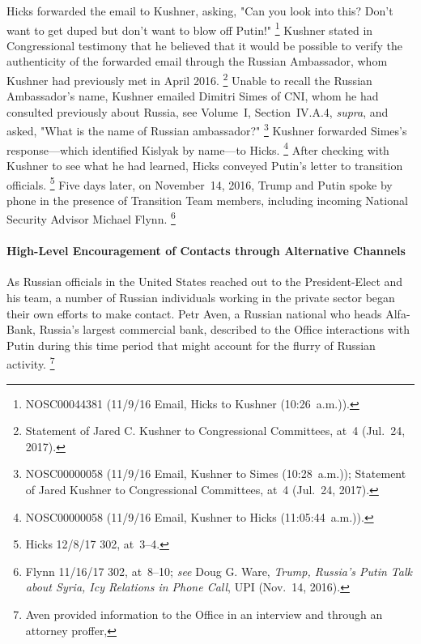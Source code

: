 Hicks forwarded the email to Kushner, asking, "Can you look into this?
Don't want to get duped but don't want to blow off Putin!"%
\footnote{NOSC00044381 (11/9/16 Email, Hicks to Kushner (10:26~a.m.)).}
Kushner stated in Congressional testimony that he believed that it would be possible to verify the authenticity of the forwarded email through the Russian Ambassador, whom Kushner had previously met in April 2016.%
\footnote{Statement of Jared C. Kushner to Congressional Committees, at~4 (Jul.~24, 2017).}
Unable to recall the Russian Ambassador's name, Kushner emailed Dimitri Simes of CNI, whom he had consulted previously about Russia, see Volume~I, Section~IV.A.4, \textit{supra}, and asked, "What is the name of Russian ambassador?"%
\footnote{NOSC00000058 (11/9/16 Email, Kushner to Simes (10:28~a.m.));
Statement of Jared Kushner to Congressional Committees, at~4 (Jul.~24, 2017).}
Kushner forwarded Simes's response---which identified Kislyak by name---to Hicks.%
\footnote{NOSC00000058 (11/9/16 Email, Kushner to Hicks (11:05:44~a.m.)).}
After checking with Kushner to see what he had learned, Hicks conveyed Putin's letter to transition officials.%
\footnote{Hicks 12/8/17 302, at~3--4.}
Five days later, on November~14, 2016, Trump and Putin spoke by phone in the presence of Transition Team members, including incoming National Security Advisor Michael Flynn.%
\footnote{Flynn 11/16/17 302, at~8--10;
\textit{see} Doug G. Ware, \textit{Trump, Russia's Putin Talk about Syria, Icy Relations in Phone Call}, UPI (Nov.~14, 2016).}

\paragraph{High-Level Encouragement of Contacts through Alternative Channels}

As Russian officials in the United States reached out to the President-Elect and his team, a number of Russian individuals working in the private sector began their own efforts to make contact.
Petr Aven, a Russian national who heads Alfa-Bank, Russia's largest commercial bank, described to the Office interactions with Putin during this time period that might account for the flurry of Russian activity.%
\footnote{Aven provided information to the Office in an interview and through an attorney proffer, }

